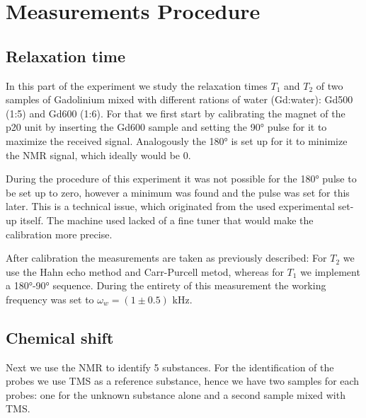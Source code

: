 \section{Measurements Procedure}
\subsection{Relaxation time}
In this part of the experiment we study the relaxation times $T_1$ and $T_2$ of two samples of Gadolinium mixed with different rations of water (Gd:water): Gd500 (1:5) and Gd600 (1:6). For that we first start by calibrating the magnet of the p20 unit by inserting the Gd600 sample and setting the 90° pulse for it to maximize the received signal. Analogously the 180° is set up for it to minimize the NMR signal, which ideally would be 0. 

During the procedure of this experiment it was not possible for the 180° pulse to be set up to zero, however a minimum was found and the pulse was set for this later. This is a technical issue, which originated from the used experimental set-up itself. The machine used lacked of a fine tuner that would make the calibration more precise. 

After calibration the measurements are taken as previously described: For $T_2$ we use the Hahn echo method and Carr-Purcell metod, whereas for $T_1$ we implement a 180°-90° sequence. 
During the entirety of this measurement the working frequency was set to $\omega_w = (1 \pm 0.5)$ kHz.
\subsection{Chemical shift}
\label{sec: chemical shift}
Next we use the NMR to identify 5 substances. For the identification of the probes we use TMS as a reference substance, hence we have two samples for each probes: one for the unknown substance alone and a second sample mixed with TMS.


